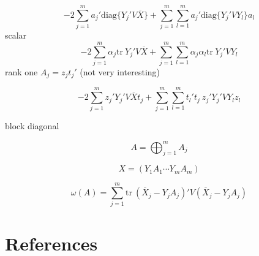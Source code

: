 \documentclass[
  12pt,
]{article}
\begin{document}
\[
-2\sum_{j=1}^m a_j'\text{diag}\{Y_j'V\overline{X}\}+
\sum_{j=1}^m\sum_{l=1}^m a_j'\text{diag}\{Y_j'VY_l^{\ }\}a_l
\]
scalar
\[
-2\sum_{j=1}^m \alpha_j\text{tr}\ Y_j'V\overline{X}+
\sum_{j=1}^m\sum_{l=1}^m\alpha_j\alpha_l\text{tr}\ Y_j'VY_l^{\ }
\]
rank one \(A_j=z_jt_j'\) (not very interesting)

\[
-2\sum_{j=1}^mz_j'Y_j'V\overline{X}t_j+
\sum_{j=1}^m\sum_{l=1}^mt_l't_j\ z_j'Y_j'VY_l^{\ }z_l
\]

block diagonal

\[
A=\bigoplus_{j=1}^m A_j
\]

\[
X=(Y_1A_1\cdots Y_mA_m)
\]

\[
\omega(A)=\sum_{j=1}^m\text{tr}\ (\overline X_j-Y_jA_j)'V(\overline X_j-Y_jA_j)
\]

\section{References}\label{references}
\end{document}

